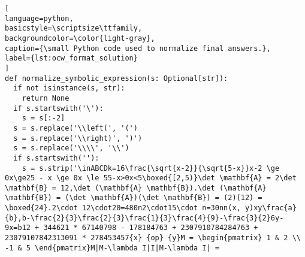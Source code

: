 \documentclass{article}
\begin{document}
\begin{lstlisting}[
language=python,
basicstyle=\scriptsize\ttfamily,
backgroundcolor=\color{light-gray},
caption={\small Python code used to normalize final answers.},
label={lst:ocw_format_solution}
]
def normalize_symbolic_expression(s: Optional[str]):
  if not isinstance(s, str):
    return None
  if s.startswith('\'):
    s = s[:-2]
  s = s.replace('\\left(', '(')
  s = s.replace('\\right)', ')')
  s = s.replace('\\\\', '\\')
  if s.startswith(''):
    s = s.strip('\inABCDk=16\frac{\sqrt{x-2}}{\sqrt{5-x}}x-2 \ge 0x\ge25 - x \ge 0x \le 55-x>0x<5\boxed{[2,5)}\det \mathbf{A} = 2\det \mathbf{B} = 12,\det (\mathbf{A} \mathbf{B}).\det (\mathbf{A} \mathbf{B}) = (\det \mathbf{A})(\det \mathbf{B}) = (2)(12) = \boxed{24}.2\cdot 12\cdot20=480n2\cdot15\cdot n=30nn(x, y)xy\frac{a}{b},b-\frac{2}{3}\frac{2}{3}\frac{1}{3}\frac{4}{9}-\frac{3}{2}6y-9x=b12 + 344621 * 67140798 - 178184763 + 2307910784284763 + 23079107842313091 * 278453457{x} {op} {y}M = \begin{pmatrix} 1 & 2 \\ -1 & 5 \end{pmatrix}M|M-\lambda I|I|M-\lambda I| = 

\end{lstlisting}
\end{document}
